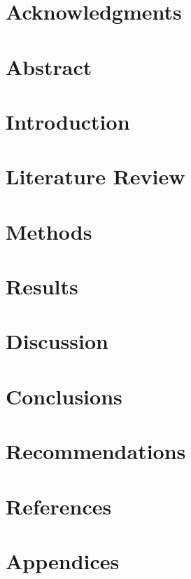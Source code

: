 \documentclass[12pt]{article}
\begin{document}

\restoregeometry

\section*{Acknowledgments}

\pagebreak

\setcounter{tocdepth}{5}
\tableofcontents
\pagebreak

\listoffigures
\listoftables
\pagebreak

\justify

\section*{Abstract}

\pagebreak

\section{Introduction}


\section{Literature Review}


\section{Methods}


\section{Results}


\section{Discussion}


\section{Conclusions}


\section{Recommendations}


\section{References}
\label{sec:ref}
\printbibliography[heading=none]

\section{Appendices}

\end{document}
